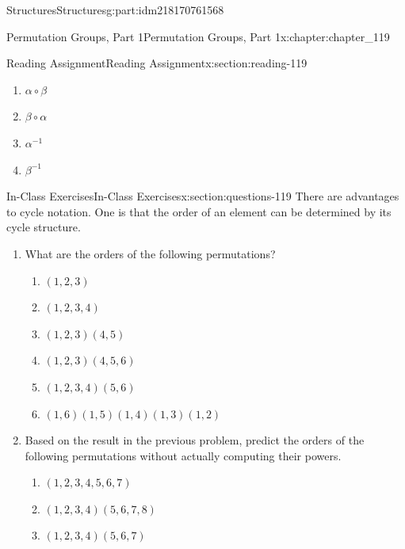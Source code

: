 \documentclass[oneside,10pt,]{book}
\numberwithin{equation}{section}
\begin{document}
\begin{partptx}{Structures}{}{Structures}{}{}{g:part:idm218170761568}
\begin{chapterptx}{Permutation Groups, Part 1}{}{Permutation Groups, Part 1}{}{}{x:chapter:chapter_119}
\begin{sectionptx}{Reading Assignment}{}{Reading Assignment}{}{}{x:section:reading-119}
\begin{enumerate}[label=\arabic*]
\begin{multicols}{2}
\begin{enumerate}[label=(\alph*)]
\item{}\(\displaystyle \alpha \circ \beta\)%
\item{}\(\displaystyle \beta \circ \alpha\)%
\item{}\(\displaystyle \alpha^{-1}\)%
\item{}\(\displaystyle \beta^{-1}\)%
\end{enumerate}
\end{multicols}
%
\end{enumerate}
%
\end{sectionptx}
%
%
\typeout{************************************************}
\typeout{************************************************}
%
\begin{sectionptx}{In-Class Exercises}{}{In-Class Exercises}{}{}{x:section:questions-119}
There are advantages to cycle notation.  One is that the order of an element can be determined by its cycle structure.%
\begin{enumerate}[label=\arabic*.]
\item{}What are the orders of the following permutations?%
\begin{multicols}{3}
\begin{enumerate}[label=(\alph*)]
\item{}\(\displaystyle (1,2,3)\)%
\item{}\(\displaystyle (1,2,3,4)\)%
\item{}\(\displaystyle (1,2,3)(4,5)\)%
\item{}\(\displaystyle (1,2,3)(4,5,6)\)%
\item{}\(\displaystyle (1,2,3,4)(5,6)\)%
\item{}\(\displaystyle (1,6)(1,5)(1,4)(1,3)(1,2)\)%
\end{enumerate}
\end{multicols}
%
\item{}Based on the result in the previous problem, predict the orders of the following permutations without actually computing their powers.%
\begin{multicols}{3}
\begin{enumerate}[label=(\alph*)]
\item{}\(\displaystyle (1,2,3,4,5,6,7)\)%
\item{}\(\displaystyle (1,2,3,4)(5,6,7,8)\)%
\item{}\(\displaystyle (1,2,3,4)(5,6,7)\)%
\end{enumerate}

\end{multicols}
\end{enumerate}
\end{sectionptx}
\end{chapterptx}
\end{partptx}
\end{document}
